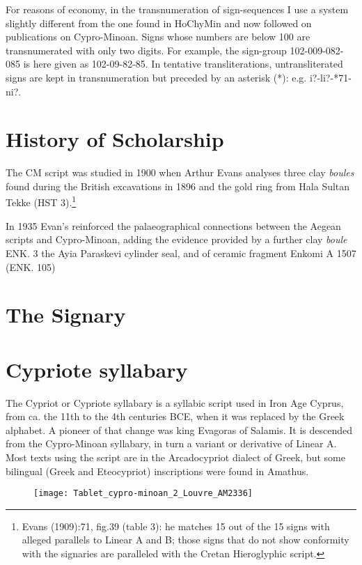 For reasons of economy, in the transnumeration of sign-sequences I use a system
slightly different from the one found in HoChyMin and now followed on publications
on Cypro-Minoan. Signs whose numbers are below 100 are transnumerated with only
two digits. For example, the sign-group 102-009-082-085 is here given as 102-09-82-85. 
In tentative transliterations, untransliterated signs are kept in transnumeration but
preceded by an asterisk (*): e.g. i?-li?-*71-ni?.

\section{History of Scholarship}

The CM script was studied in 1900 when Arthur Evans analyses three clay \textit{boules}
found during the British excavations in 1896 and the gold ring from Hala Sultan Tekke (HST 3).\footnote{Evans (1909):71, fig.39 (table 3): he matches 15 out of the 15 signs with alleged parallels to Linear A and B; those signs that do not show conformity with the signaries are paralleled with the Cretan Hieroglyphic script.}

In 1935 Evan's reinforced the palaeographical connections between the Aegean scripts and Cypro-Minoan, adding the
evidence provided by a further clay \textit{boule} ENK. 3 the Ayia Paraskevi cylinder seal, and of ceramic fragment Enkomi A 1507 (ENK. 105)


\section{The Signary}



\section{Cypriote syllabary}

The Cypriot or Cypriote syllabary is a syllabic script used in Iron Age Cyprus, from ca. the 11th to the 4th centuries BCE, when it was replaced by the Greek alphabet. A pioneer of that change was king Evagoras of Salamis. It is descended from the Cypro-Minoan syllabary, in turn a variant or derivative of Linear A. Most texts using the script are in the Arcadocypriot dialect of Greek, but some bilingual (Greek and Eteocypriot) inscriptions were found in Amathus.

\begin{figure}[htbp]
\texttt{[image: Tablet\_cypro-minoan\_2\_Louvre\_AM2336]}
\end{figure}

